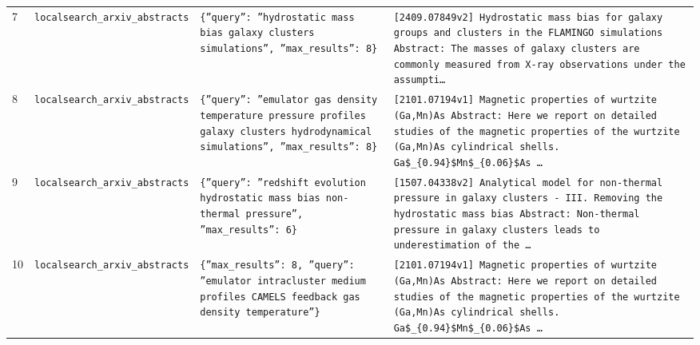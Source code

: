 \documentclass[11pt,a4paper]{article}
\begin{document}
\begin{longtable}{@{}p{}p{}p{}p{}@{}}
7 & \texttt{local}\newline\texttt{search\_\allowbreak{}arxiv\_\allowbreak{}abstracts} & \texttt{\{''query'':\allowbreak{} ''hydrostatic mass bias galaxy clusters simulations'',\allowbreak{} ''max\_\allowbreak{}results'':\allowbreak{} 8\}\allowbreak{}} & \texttt{[2409.07849v2]\allowbreak{} Hydrostatic mass bias for galaxy groups and clusters in the FLAMINGO simulations Abstract:\allowbreak{} The masses of galaxy clusters are commonly measured from X-ray observations under the assumpti\ldots{}\allowbreak{}} \\
8 & \texttt{local}\newline\texttt{search\_\allowbreak{}arxiv\_\allowbreak{}abstracts} & \texttt{\{''query'':\allowbreak{} ''emulator gas density temperature pressure profiles galaxy clusters hydrodynamical simulations'',\allowbreak{} ''max\_\allowbreak{}results'':\allowbreak{} 8\}\allowbreak{}} & \texttt{[2101.07194v1]\allowbreak{} Magnetic properties of wurtzite (Ga,\allowbreak{}Mn)\allowbreak{}As Abstract:\allowbreak{} Here we report on detailed studies of the magnetic properties of the wurtzite (Ga,\allowbreak{}Mn)\allowbreak{}As cylindrical shells. Ga\$\_\allowbreak{}\{0.94\}\allowbreak{}\$Mn\$\_\allowbreak{}\{0.06\}\allowbreak{}\$As \ldots{}\allowbreak{}} \\
9 & \texttt{local}\newline\texttt{search\_\allowbreak{}arxiv\_\allowbreak{}abstracts} & \texttt{\{''query'':\allowbreak{} ''redshift evolution hydrostatic mass bias non-thermal pressure'',\allowbreak{} ''max\_\allowbreak{}results'':\allowbreak{} 6\}\allowbreak{}} & \texttt{[1507.04338v2]\allowbreak{} Analytical model for non-thermal pressure in galaxy clusters - III. Removing the hydrostatic mass bias Abstract:\allowbreak{} Non-thermal pressure in galaxy clusters leads to underestimation of the \ldots{}\allowbreak{}} \\
10 & \texttt{local}\newline\texttt{search\_\allowbreak{}arxiv\_\allowbreak{}abstracts} & \texttt{\{''max\_\allowbreak{}results'':\allowbreak{} 8,\allowbreak{} ''query'':\allowbreak{} ''emulator intracluster medium profiles CAMELS feedback gas density temperature''\}\allowbreak{}} & \texttt{[2101.07194v1]\allowbreak{} Magnetic properties of wurtzite (Ga,\allowbreak{}Mn)\allowbreak{}As Abstract:\allowbreak{} Here we report on detailed studies of the magnetic properties of the wurtzite (Ga,\allowbreak{}Mn)\allowbreak{}As cylindrical shells. Ga\$\_\allowbreak{}\{0.94\}\allowbreak{}\$Mn\$\_\allowbreak{}\{0.06\}\allowbreak{}\$As \ldots{}\allowbreak{}} \\

\end{longtable}
\end{document}
